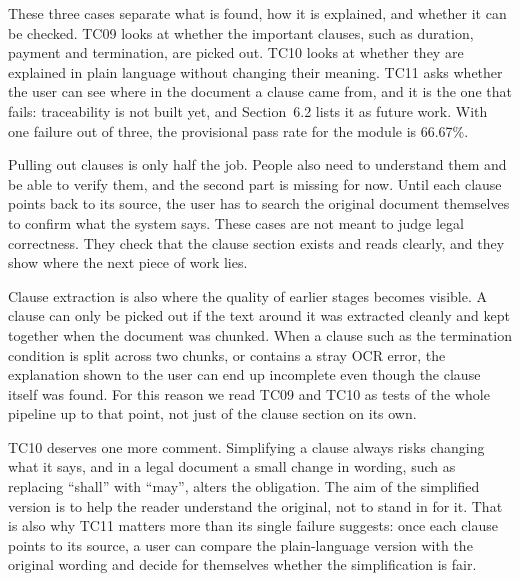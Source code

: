 \documentclass[12pt,a4paper,oneside]{report}
\begin{document}
These three cases separate what is found, how it is explained, and whether it can be checked. TC09 looks at whether the important clauses, such as duration, payment and termination, are picked out. TC10 looks at whether they are explained in plain language without changing their meaning. TC11 asks whether the user can see where in the document a clause came from, and it is the one that fails: traceability is not built yet, and Section~6.2 lists it as future work. With one failure out of three, the provisional pass rate for the module is 66.67\%.

Pulling out clauses is only half the job. People also need to understand them and be able to verify them, and the second part is missing for now. Until each clause points back to its source, the user has to search the original document themselves to confirm what the system says. These cases are not meant to judge legal correctness. They check that the clause section exists and reads clearly, and they show where the next piece of work lies.

Clause extraction is also where the quality of earlier stages becomes visible. A clause can only be picked out if the text around it was extracted cleanly and kept together when the document was chunked. When a clause such as the termination condition is split across two chunks, or contains a stray OCR error, the explanation shown to the user can end up incomplete even though the clause itself was found. For this reason we read TC09 and TC10 as tests of the whole pipeline up to that point, not just of the clause section on its own.

TC10 deserves one more comment. Simplifying a clause always risks changing what it says, and in a legal document a small change in wording, such as replacing ``shall'' with ``may'', alters the obligation. The aim of the simplified version is to help the reader understand the original, not to stand in for it. That is also why TC11 matters more than its single failure suggests: once each clause points to its source, a user can compare the plain-language version with the original wording and decide for themselves whether the simplification is fair.

\end{document}
